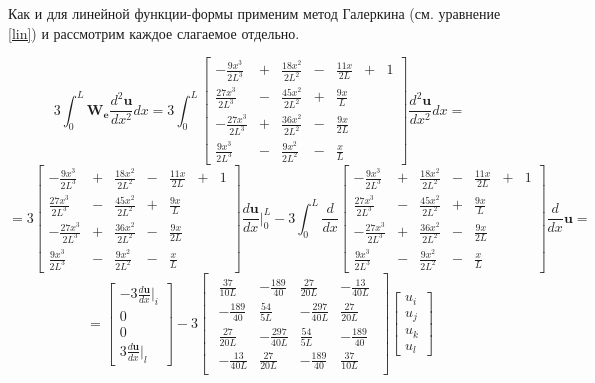 Как и для линейной функции-формы применим метод Галеркина (см. уравнение \ref{lin}) и рассмотрим каждое слагаемое отдельно.

$$3 \int_0^L \mathbf{W_e} \frac{d^2 \mathbf{u}}{dx^2} dx
=
3\int_0^L
\begin{bmatrix}
	-\frac{9x^3}{2L^3}&+&\frac{18x^2}{2L^2}&-&\frac{11x}{2L} &+& 1\\
	\frac{27x^3}{2L^3}&-&\frac{45x^2}{2L^2}&+&\frac{9x}{L}&&\\
	-\frac{27x^3}{2L^3}&+&\frac{36x^2}{2L^2}&-&\frac{9x}{2L}&&\\
	\frac{9x^3}{2L^3}&-&\frac{9x^2}{2L^2}&-&\frac{x}{L}&&
\end{bmatrix}
\frac{d^2 \mathbf{u}}{dx^2} dx
=
$$
$$
=
3
\begin{bmatrix}
	-\frac{9x^3}{2L^3}&+&\frac{18x^2}{2L^2}&-&\frac{11x}{2L} &+& 1\\
	\frac{27x^3}{2L^3}&-&\frac{45x^2}{2L^2}&+&\frac{9x}{L}&&\\
	-\frac{27x^3}{2L^3}&+&\frac{36x^2}{2L^2}&-&\frac{9x}{2L}&&\\
	\frac{9x^3}{2L^3}&-&\frac{9x^2}{2L^2}&-&\frac{x}{L}&&
\end{bmatrix}
\frac{d\mathbf{u}}{dx} |_0^L
  -3  \int_0^L \frac{d}{dx}
\begin{bmatrix}
	-\frac{9x^3}{2L^3}&+&\frac{18x^2}{2L^2}&-&\frac{11x}{2L} &+& 1\\
	\frac{27x^3}{2L^3}&-&\frac{45x^2}{2L^2}&+&\frac{9x}{L}&&\\
	-\frac{27x^3}{2L^3}&+&\frac{36x^2}{2L^2}&-&\frac{9x}{2L}&&\\
	\frac{9x^3}{2L^3}&-&\frac{9x^2}{2L^2}&-&\frac{x}{L}&&
\end{bmatrix}
\frac{d}{dx} \mathbf{u}
=$$
$$
=
\begin{bmatrix}
	  -3 \frac{d\mathbf{u}}{dx}|_i \\
	0\\
	0\\
3\frac{d\mathbf{u}}{dx}|_l
\end{bmatrix}
  -3 
\begin{bmatrix}
\begin{array}{rrrr}
	\frac{37}{10L} & -\frac{189}{40} & \frac{27}{20L} & -\frac{13}{40L}\\
	-\frac{189}{40} & \frac{54}{5L} & -\frac{297}{40L} & \frac{27}{20L}\\
	\frac{27}{20L} &  -\frac{297}{40L} & \frac{54}{5L} & -\frac{189}{40}\\
	-\frac{13}{40L} & \frac{27}{20L} & -\frac{189}{40} & \frac{37}{10L}
\end{array}
\end{bmatrix}
\begin{bmatrix}
u_i \\
u_j \\
u_k\\
u_l
\end{bmatrix}
$$

